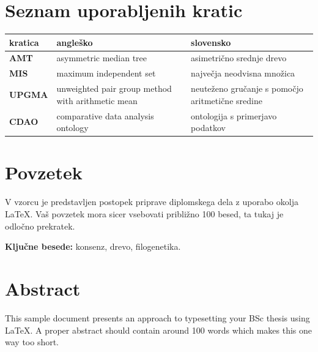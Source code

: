 \documentclass[a4paper, 12pt]{book}
\newcommand{\tkeywords}{konsenz, drevo, filogenetika}
\newcommand{\clearemptydoublepage}{\newpage{\pagestyle{empty}\cleardoublepage}}
\begin{document}
\clearemptydoublepage

\def\thepage{}%
\tableofcontents{}


\clearemptydoublepage


\chapter*{Seznam uporabljenih kratic}

\begin{tabular}{l|p{6cm}|p{6cm}}
  {\bf kratica} & {\bf angleško} & {\bf slovensko} \\ \hline
  {\bf AMT} & asymmetric median tree & asimetrično srednje drevo \\
  {\bf MIS} & maximum independent set & največja neodvisna množica \\
  {\bf UPGMA} & unweighted pair group method with arithmetic mean & neuteženo gručanje s pomočjo aritmetične sredine \\
  {\bf CDAO} & comparative data analysis ontology  & ontologija s primerjavo podatkov \\
\end{tabular}



\clearemptydoublepage

\chapter*{Povzetek}
V vzorcu je predstavljen postopek priprave diplomskega dela z uporabo okolja \LaTeX. Vaš povzetek mora sicer vsebovati približno 100 besed, ta tukaj je odločno prekratek.
\bigskip

\noindent\textbf{Ključne besede:} \tkeywords.
\clearemptydoublepage

\chapter*{Abstract}
This sample document presents an approach to typesetting your BSc thesis using \LaTeX. A proper abstract should contain around 100 words which makes this one way too short.
\bigskip
\end{document}
